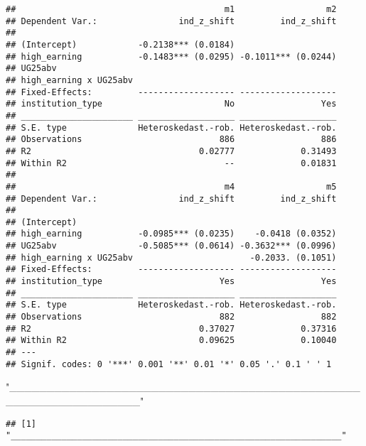 \documentclass[
]{article}
\newenvironment{Shaded}{\begin{snugshade}}{\end{snugshade}}
\newcommand{\StringTok}[1]{\textcolor[rgb]{0.31,0.60,0.02}{#1}}
\begin{document}
\begin{verbatim}
##                                         m1                  m2
## Dependent Var.:                ind_z_shift         ind_z_shift
##                                                               
## (Intercept)            -0.2138*** (0.0184)                    
## high_earning           -0.1483*** (0.0295) -0.1011*** (0.0244)
## UG25abv                                                       
## high_earning x UG25abv                                        
## Fixed-Effects:         ------------------- -------------------
## institution_type                        No                 Yes
## ______________________ ___________________ ___________________
## S.E. type              Heteroskedast.-rob. Heteroskedast.-rob.
## Observations                           886                 886
## R2                                 0.02777             0.31493
## Within R2                               --             0.01831
## 
##                                         m4                  m5
## Dependent Var.:                ind_z_shift         ind_z_shift
##                                                               
## (Intercept)                                                   
## high_earning           -0.0985*** (0.0235)    -0.0418 (0.0352)
## UG25abv                -0.5085*** (0.0614) -0.3632*** (0.0996)
## high_earning x UG25abv                       -0.2033. (0.1051)
## Fixed-Effects:         ------------------- -------------------
## institution_type                       Yes                 Yes
## ______________________ ___________________ ___________________
## S.E. type              Heteroskedast.-rob. Heteroskedast.-rob.
## Observations                           882                 882
## R2                                 0.37027             0.37316
## Within R2                          0.09625             0.10040
## ---
## Signif. codes: 0 '***' 0.001 '**' 0.01 '*' 0.05 '.' 0.1 ' ' 1
\end{verbatim}

\begin{Shaded}
\begin{Highlighting}[]
\StringTok{"\_\_\_\_\_\_\_\_\_\_\_\_\_\_\_\_\_\_\_\_\_\_\_\_\_\_\_\_\_\_\_\_\_\_\_\_\_\_\_\_\_\_\_\_\_\_\_\_\_\_\_\_\_\_\_\_\_\_\_\_\_\_\_\_\_"}
\end{Highlighting}
\end{Shaded}

\begin{verbatim}
## [1] "_________________________________________________________________"
\end{verbatim}
\end{document}
